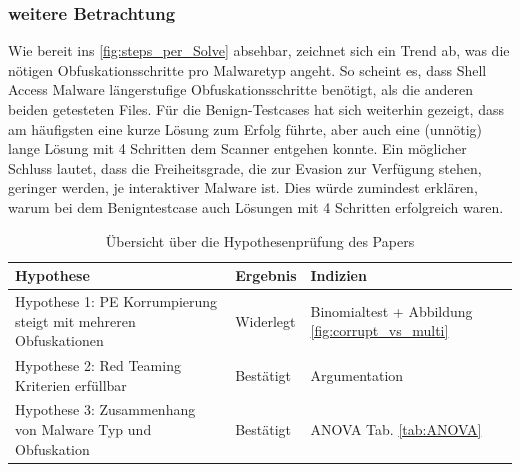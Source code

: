 \subsubsection{weitere Betrachtung}
Wie bereit ins \ref{fig:steps_per_Solve} absehbar, zeichnet sich ein Trend ab, was die nötigen Obfuskationsschritte pro Malwaretyp angeht. So scheint es, dass Shell Access Malware längerstufige Obfuskationsschritte benötigt, als die anderen beiden getesteten Files. Für die Benign-Testcases hat sich weiterhin gezeigt, dass am häufigsten eine kurze Lösung zum Erfolg führte, aber auch eine (unnötig) lange Lösung mit 4 Schritten dem Scanner entgehen konnte. Ein möglicher Schluss lautet, dass die Freiheitsgrade, die zur Evasion zur Verfügung stehen, geringer werden, je interaktiver Malware ist. Dies würde zumindest erklären, warum bei dem Benigntestcase auch Lösungen mit 4 Schritten erfolgreich waren.

\begin{table}[h]
    \centering
    \begin{tabular}{|p{}|l|l|}
        \hline
        \textbf{Hypothese} & \textbf{Ergebnis} & \textbf{Indizien} \\ \hline
        Hypothese 1: PE Korrumpierung steigt mit mehreren Obfuskationen & Widerlegt& Binomialtest + Abbildung \ref{fig:corrupt_vs_multi} \\ \hline
        Hypothese 2: Red Teaming Kriterien erfüllbar & Bestätigt & Argumentation \\ \hline
        Hypothese 3: Zusammenhang von Malware Typ und Obfuskation & Bestätigt & ANOVA Tab. \ref{tab:ANOVA} \\ \hline
    \end{tabular}
    \caption{Übersicht über die Hypothesenprüfung des Papers}
    \label{tab:hypothesenpruefung}
\end{table}